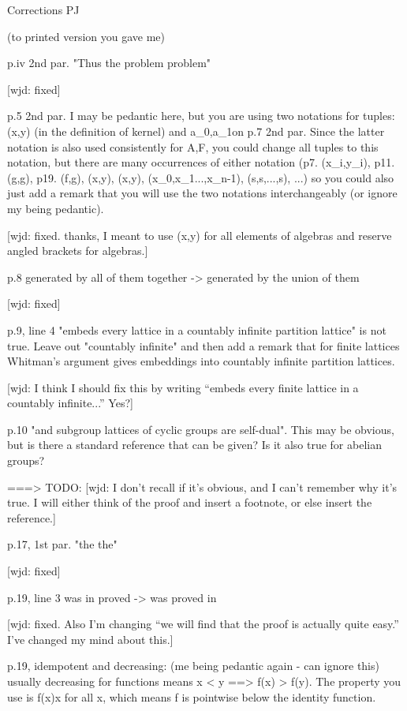 Corrections PJ

(to printed version you gave me)

p.iv 2nd par. "Thus the problem problem"   

[wjd: fixed]

p.5 2nd par. I may be pedantic here, but you are using two notations for tuples: (x,y)  (in the definition of kernel) and \langle a_0,a_1\langle on p.7 2nd par. Since the latter notation is also used consistently for \langle A,F\rangle, you could change all tuples to this notation, but there are many occurrences of either notation (p7. (x_i,y_i), p11. (g,g), p19. (f,g), (x,y), (x,y), (x_0,x_1...,x_{n-1}), (s,s,...,s), ...) so you could also just add a remark that you will use the two notations interchangeably (or ignore my being pedantic).

[wjd: fixed.  thanks, I meant to use (x,y) for all elements of algebras and reserve angled brackets for algebras.]

p.8 generated by all of them together -> generated by the union of them

[wjd: fixed]

p.9, line 4 "embeds every lattice in a countably infinite partition lattice"
is not true. Leave out "countably infinite" and then add a remark that for finite lattices Whitman's argument gives embeddings into countably infinite partition lattices.

[wjd: I think I should fix this by writing ``embeds every finite lattice in a countably infinite...'' Yes?]

p.10 "and subgroup lattices of cyclic groups are self-dual". This may be obvious, but is there a standard reference that can be given? Is it also true for abelian groups?

===> TODO:
[wjd: I don't recall if it's obvious, and I can't remember why it's true.  I will either think of the proof and insert a footnote, or else insert the reference.]

p.17, 1st par. "the the"

[wjd: fixed]

p.19, line 3 was in proved -> was proved in

[wjd: fixed.  Also I'm changing ``we will find that the proof is actually quite easy.'' I've changed my mind about this.]

p.19, idempotent and decreasing: (me being pedantic again - can ignore this) usually decreasing for functions means x < y ==> f(x) > f(y). The property you use is f(x)\le x for all x, which means f is pointwise below the identity function.

